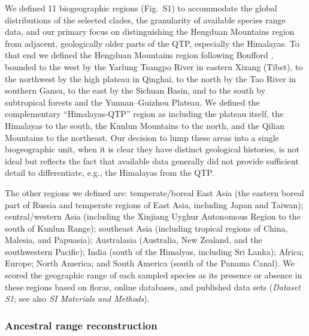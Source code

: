 We defined 11 biogeographic regions (Fig.~S1) to accommodate the global distributions of the selected clades, the granularity of available species range data, and our primary focus on distinguishing the Hengduan Mountains region from adjacent, geologically older parts of the QTP, especially the Himalayas. To that end we defined the Hengduan Mountains region following Boufford \citep{Boufford2014}, bounded to the west by the Yarlung Tsangpo River in eastern Xizang (Tibet), to the northwest by the high plateau in Qinghai, to the north by the Tao River in southern Gansu, to the east by the Sichuan Basin, and to the south by subtropical forests and the Yunnan–Guizhou Plateau. We defined the complementary ``Himalayas-QTP'' region as including the plateau itself, the Himalayas to the south, the Kunlun Mountains to the north, and the Qilian Mountains to the northeast. Our decision to lump these areas into a single biogeographic unit, when it is clear they have distinct geological histories, is not ideal but reflects the fact that available data generally did not provide sufficient detail to differentiate, e.g., the Himalayas from the QTP.

The other regions we defined are: temperate/boreal East Asia (the eastern boreal part of Russia and temperate regions of East Asia, including Japan and Taiwan); central/western Asia (including the Xinjiang Uyghur Autonomous Region to the south of Kunlun Range); southeast Asia (including tropical regions of China, Malesia, and Papuasia); Australasia (Australia, New Zealand, and the southwestern Pacific); India (south of the Himalyas, including Sri Lanka); Africa; Europe; North America; and South America (south of the Panama Canal). We scored the geographic range of each sampled species as its presence or absence in these regions based on floras, online databases, and published data sets (\textit{Dataset S1}; see also \textit{SI Materials and Methods}).

\subsubsection{Ancestral range reconstruction}

